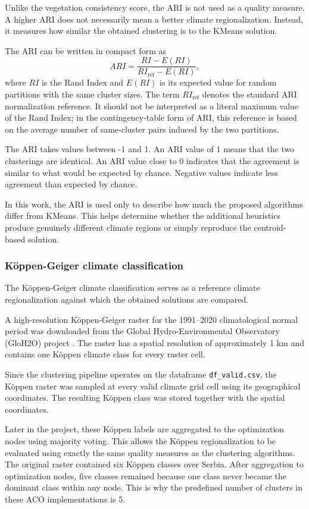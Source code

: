 \documentclass[11pt]{article}
\begin{document}
Unlike the vegetation consistency score, the ARI is not used as a quality measure. A higher ARI does not necessarily mean a better climate regionalization. Instead, it measures how similar the obtained clustering is to the KMeans solution.

The ARI can be written in compact form as
\[
ARI=
\frac{RI-E(RI)}
{RI_{\mathrm{ref}}-E(RI)},
\]
where $RI$ is the Rand Index and $E(RI)$ is its expected value for random
partitions with the same cluster sizes. The term $RI_{\mathrm{ref}}$ denotes
the standard ARI normalization reference. It should not be interpreted as a
literal maximum value of the Rand Index; in the contingency-table form of ARI,
this reference is based on the average number of same-cluster pairs induced by
the two partitions.

The ARI takes values between -1 and 1. An ARI value of 1 means that the two clusterings are identical. An ARI value close to 0 indicates that the agreement is similar to what would be expected by chance. Negative values indicate less agreement than expected by chance.

In this work, the ARI is used only to describe how much the proposed algorithms differ from KMeans. This helps determine whether the additional heuristics produce genuinely different climate regions or simply reproduce the centroid-based solution.

\subsubsection{Köppen-Geiger climate classification}

The Köppen-Geiger climate classification serves as a reference climate regionalization against which the obtained solutions are compared.

A high-resolution Köppen-Geiger raster for the 1991--2020 climatological normal period was downloaded from the Global Hydro-Environmental Observatory (GloH2O) project \cite{beck2018}. The raster has a spatial resolution of approximately 1 km and contains one Köppen climate class for every raster cell.

Since the clustering pipeline operates on the dataframe \texttt{df\_valid.csv}, the Köppen raster was sampled at every valid climate grid cell using its geographical coordinates. The resulting Köppen class was stored together with the spatial coordinates.

Later in the project, these Köppen labels are aggregated to the optimization nodes using majority voting. This allows the Köppen regionalization to be evaluated using exactly the same quality measures as the clustering algorithms. The original raster contained six Köppen classes over Serbia. After aggregation to optimization nodes, five classes remained because one class never became the dominant class within any node. This is why the predefined number of clusters in these ACO implementations is 5.
\end{document}
